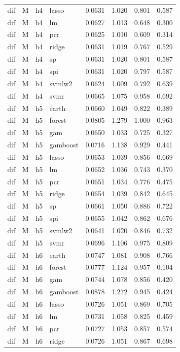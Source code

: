 \begin{ThreePartTable}
\begin{longtable}[t]{llclcccc}
dif & M & h4 & lasso & 0.0631 & 1.020 & 0.801 & 0.587\\
dif & M & h4 & lm & 0.0627 & 1.013 & 0.648 & 0.300\\
dif & M & h4 & pcr & 0.0625 & 1.010 & 0.609 & 0.314\\
dif & M & h4 & ridge & 0.0631 & 1.019 & 0.767 & 0.529\\
dif & M & h4 & sp & 0.0631 & 1.020 & 0.801 & 0.587\\
dif & M & h4 & spi & 0.0631 & 1.020 & 0.797 & 0.587\\
dif & M & h4 & svmlw2 & 0.0624 & 1.009 & 0.792 & 0.639\\
dif & M & h4 & svmr & 0.0665 & 1.075 & 0.958 & 0.692\\
\addlinespace
dif & M & h5 & earth & 0.0660 & 1.049 & 0.822 & 0.389\\
dif & M & h5 & forest & 0.0805 & 1.279 & 1.000 & 0.963\\
dif & M & h5 & gam & 0.0650 & 1.033 & 0.725 & 0.327\\
dif & M & h5 & gamboost & 0.0716 & 1.138 & 0.929 & 0.441\\
dif & M & h5 & lasso & 0.0653 & 1.039 & 0.856 & 0.669\\
dif & M & h5 & lm & 0.0652 & 1.036 & 0.743 & 0.370\\
dif & M & h5 & pcr & 0.0651 & 1.034 & 0.776 & 0.475\\
dif & M & h5 & ridge & 0.0654 & 1.039 & 0.842 & 0.645\\
dif & M & h5 & sp & 0.0661 & 1.050 & 0.886 & 0.722\\
dif & M & h5 & spi & 0.0655 & 1.042 & 0.862 & 0.676\\
dif & M & h5 & svmlw2 & 0.0641 & 1.020 & 0.846 & 0.732\\
dif & M & h5 & svmr & 0.0696 & 1.106 & 0.975 & 0.809\\
\addlinespace
dif & M & h6 & earth & 0.0747 & 1.081 & 0.908 & 0.766\\
dif & M & h6 & forest & 0.0777 & 1.124 & 0.957 & 0.104\\
dif & M & h6 & gam & 0.0744 & 1.078 & 0.856 & 0.420\\
dif & M & h6 & gamboost & 0.0878 & 1.272 & 0.945 & 0.424\\
dif & M & h6 & lasso & 0.0726 & 1.051 & 0.869 & 0.705\\
dif & M & h6 & lm & 0.0731 & 1.058 & 0.825 & 0.459\\
dif & M & h6 & pcr & 0.0727 & 1.053 & 0.857 & 0.574\\
dif & M & h6 & ridge & 0.0726 & 1.051 & 0.867 & 0.698\\

\end{longtable}
\end{ThreePartTable}
